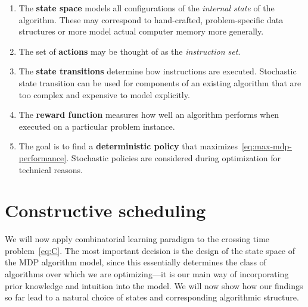 \documentclass{report}
\theoremstyle{definition}
\theoremstyle{plain}
\begin{document}
\vspace{1em}
\begin{mdframed}
\vspace{1em}
\begin{enumerate}[label=$\bullet$,leftmargin=2.5em,rightmargin=4em,midpenalty=5]
  \item The \textbf{state space} models all configurations of the \emph{internal state}
        of the algorithm. These may correspond to hand-crafted, problem-specific
        data structures or more model actual computer memory more generally.

  \item The set of \textbf{actions} may be thought of as the \emph{instruction set}.

  \item The \textbf{state transitions} determine how instructions are executed. Stochastic
        state transition can be used for components of an existing algorithm
        that are too complex and expensive to model explicitly.

  \item The \textbf{reward function} measures how well an algorithm performs when
        executed on a particular problem instance.

  \item The goal is to find a \textbf{deterministic policy} that
        maximizes~\eqref{eq:max-mdp-performance}. Stochastic policies are
        considered during optimization for technical reasons.
\end{enumerate}
\vspace{1em}
\end{mdframed}

\section{Constructive scheduling}\label{sec:MDP}

We will now apply combinatorial learning paradigm to the crossing time
problem~\eqref{eq:C}.
%
The most important decision is the design of the state space of the MDP
algorithm model, since this essentially determines the class of algorithms over
which we are optimizing---it is our main way of incorporating prior knowledge
and intuition into the model.
%
We will now show how our findings so far lead
to a natural choice of states and corresponding algorithmic structure.
\end{document}
